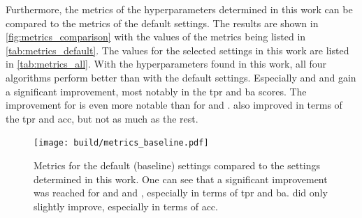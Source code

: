 Furthermore, the metrics of the hyperparameters determined in this work can be compared to the
metrics of the default settings. The results are shown in \autoref{fig:metrics_comparison} with the
values of the metrics being listed in \autoref{tab:metrics_default}. The values for the selected
settings in this work are listed in \autoref{tab:metrics_all}.
With the hyperparameters found in this work, all four algorithms perform better than with the default
settings. Especially \tcc{} and \tailcuts{} and \mars{} gain a significant improvement, most notably in the \gls{tpr} and
\gls{ba} scores. The improvement for \tcc{} is even more notable than for \mars{} and \tailcuts{}.\fact{}
also improved in terms of the \gls{tpr} and \gls{acc}, but not as much as the rest.

\begin{figure}
    \centering
    \texttt{[image: build/metrics\_baseline.pdf]}
    \caption{Metrics for the default (baseline) settings compared to the settings determined in this work.
    One can see that a significant improvement was reached for \tcc{} and \tailcuts{} and \mars{}, especially in terms of \gls{tpr} and \gls{ba}.
    \fact{} did only slightly improve, especially in terms of \gls{acc}.}
    \label{fig:metrics_comparison}
\end{figure}
